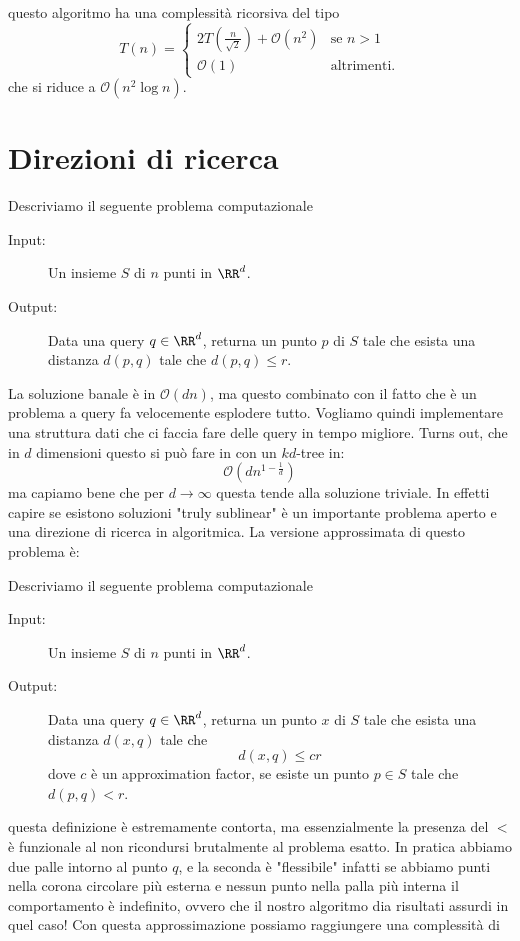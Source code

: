 \documentclass[11pt]{scrartcl}
\newcommand{\bigo}{\mathcal{O}}
\begin{document}
	questo algoritmo ha una complessità ricorsiva del tipo
	$$T(n)=\begin{cases}
		2T\left(\frac{n}{\sqrt{2}}\right)+\bigo\left(n^2\right) & \text{se $n>1$} \\
		\bigo(1) & \text{altrimenti.}
	\end{cases}$$
	che si riduce a $\bigo(n^2\log n)$.
	
	\newpage
	
	\section{Direzioni di ricerca}
	\begin{example}[r-NN problem]
		Descriviamo il seguente problema computazionale
		\begin{description}
			\item[Input:] Un insieme $S$ di $n$ punti in $\RR^d$.
			\item[Output:] Data una query $q\in\RR^d$, returna un punto $p$ di $S$ tale che esista una distanza $d(p,q)$ tale che $d(p,q)\le r$.
		\end{description}
	\end{example}
	La soluzione banale è in $\bigo(dn)$, ma questo combinato con il fatto che è un problema a query fa velocemente esplodere tutto. Vogliamo quindi implementare una struttura dati che ci faccia fare delle query in tempo migliore. Turns out, che in $d$ dimensioni questo si può fare in con un $kd$-tree in:
	$$\bigo\left(dn^{1-\frac{1}{d}}\right)$$
	ma capiamo bene che per $d\to\infty$ questa tende alla soluzione triviale. In effetti capire se esistono soluzioni "truly sublinear" è un importante problema aperto e una direzione di ricerca in algoritmica. La versione approssimata di questo problema è:
	\begin{example}
		Descriviamo il seguente problema computazionale
		\begin{description}
			\item[Input:] Un insieme $S$ di $n$ punti in $\RR^d$.
			\item[Output:] Data una query $q\in\RR^d$, returna un punto $x$ di $S$ tale che esista una distanza $d(x,q)$ tale che 
			$$d(x,q)\le c r$$
			dove $c$ è un approximation factor, se esiste un punto $p\in S$ tale che $d(p,q)<r$.
		\end{description}
	\end{example}
	questa definizione è estremamente contorta, ma essenzialmente la presenza del $<$ è funzionale al non ricondursi brutalmente al problema esatto. In pratica abbiamo due palle intorno al punto $q$, e la seconda è "flessibile" infatti se abbiamo punti nella corona circolare più esterna e nessun punto nella palla più interna il comportamento è indefinito, ovvero che il nostro algoritmo dia risultati assurdi in quel caso! Con questa approssimazione possiamo raggiungere una complessità di 
\end{document}
